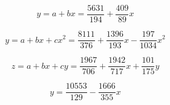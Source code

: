\documentclass[10pt]{article}
\begin{document}
\begin{enumerate}[leftmargin=\labelsep]
\begin{figure}[h]
\begin{minipage}[c]{0.48\linewidth}
        \end{minipage}%
    \end{figure}

    \begin{equation}
        y = a + bx = \frac{5631}{194} + \frac{409}{89}x
    \end{equation}

    \begin{equation}
        y = a + bx + cx^2 = \frac{8111}{376} + \frac{1396}{193}x - \frac{197}{1034}x^2
    \end{equation}

    \begin{equation}
        z = a + bx + cy = \frac{1967}{706} + \frac{1942}{717}x + \frac{101}{175}y
    \end{equation}

    \begin{equation}
        y = \frac{10553}{129} - \frac{1666}{355}x        
    \end{equation}
    
\end{enumerate}
\end{document}

